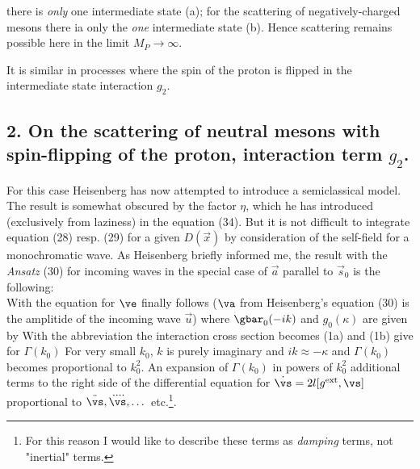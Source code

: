 there is \textit{only} one intermediate state (a); for the scattering of negatively-charged mesons there ia only the \textit{one} intermediate state (b). Hence scattering remains possible here in the limit $M_P \to \infty$.

It is similar in processes where the spin of the proton is flipped in the intermediate state interaction $g_2$.

\subsection*{2. On the scattering of neutral mesons with spin-flipping of the proton, interaction term $g_2$.}

For this case Heisenberg has now attempted to introduce a semiclassical model. The result is somewhat obscured by the factor $\eta$, which he has introduced (exclusively from laziness) in the equation (34). But it is not difficult to integrate equation (28) resp. (29) for a given $D(\vec{x})$ by consideration of the self-field for a monochromatic wave. As Heisenberg briefly informed me, the result with the \textit{Ansatz} (30) for incoming waves in the special case of $\vec{a}$ parallel to $\vec{s}_0$ is the following:\\
With
the equation for $\ve$ finally follows ($\va$ from Heisenberg's equation (30) is the amplitide of the incoming wave $\vec{u}$)
where $\gbar_0(-ik)$ and $g_0(\kappa)$ are given by
With the abbreviation
the interaction cross section becomes
(1a) and (1b) give for $\Gamma(k_0)$
For very small $k_0$, $k$ is purely imaginary and $ik \approx -\kappa$ and $\Gamma(k_0)$ becomes proportional to $k_0^2$. An expansion of $\Gamma(k_0)$ in powers of $k_0^2$
 additional terms to the right side of the differential equation for $\dot{\vs} = 2l[g^\text{ext},\vs]$ proportional to $\ddot{\vs}, \ddddot{\vs}, \dots$ etc.\footnote{For this reason I would like to describe these terms as \textit{damping} terms, not "inertial" terms.}.

